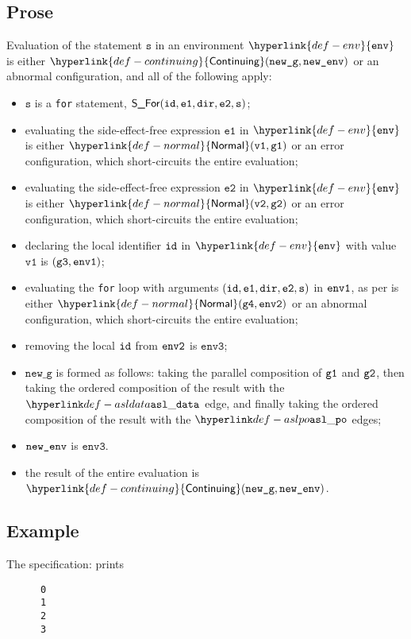 \documentclass{book}
\newcommand\ProseOrAbnormal[0]{or an abnormal configuration, which short-circuits the entire evaluation}
\newcommand\ProseOrError[0]{or an error configuration, which short-circuits the entire evaluation}
\newcommand\Normal[0]{\hyperlink{def-normal}{\textsf{Normal}}}
\newcommand\Continuing[0]{\hyperlink{def-continuing}{\textsf{Continuing}}}
\newcommand\env[0]{\hyperlink{def-env}{\texttt{env}}}
\newcommand\envthree[0]{\texttt{env3}}
\newcommand\newg[0]{\texttt{new\_g}}
\newcommand\vs[0]{\texttt{s}}
\newcommand\vvone[0]{\texttt{v1}}
\newcommand\vvtwo[0]{\texttt{v2}}
\newcommand\veone[0]{\texttt{e1}}
\newcommand\vetwo[0]{\texttt{e2}}
\newcommand\vgthree[0]{\texttt{g3}}
\newcommand\vgfour[0]{\texttt{g4}}
\newcommand\dir[0]{\texttt{dir}}
\begin{document}
    \subsection{Prose}
    Evaluation of the statement $\vs$ in an environment $\env$ is
    either $\Continuing(\newg, \newenv)$ or an abnormal configuration,
    and all of the following apply:
    \begin{itemize}
    \item $\vs$ is a \texttt{for} statement, $\SFor(\id, \veone, \dir, \vetwo, \vs)$;
    \item evaluating the side-effect-free expression $\veone$ in $\env$ is either
    $\Normal(\vvone, \vgone)$ \ProseOrError;
    \item evaluating the side-effect-free expression $\vetwo$ in $\env$ is either
    $\Normal(\vvtwo, \vgtwo)$ \ProseOrError;
    \item declaring the local identifier $\texttt{id}$ in $\env$ with value $\vvone$ is $(\vgthree, \envone)$;
    \item evaluating the \texttt{for} loop with arguments $(\id, \veone, \dir, \vetwo, \vs)$ in $\texttt{env1}$,
    as per  is either $\Normal(\vgfour, \envtwo)$ \ProseOrAbnormal;
    \item removing the local $\texttt{id}$ from $\texttt{env2}$ is $\envthree$;
    \item $\newg$ is formed as follows: taking the parallel composition of $\texttt{g1}$ and $\texttt{g2}$,
    then taking the ordered composition of the result with the $\asldata$ edge,
    and finally taking the ordered composition of the result with the $\aslpo$ edges;
    \item $\texttt{new\_env}$ is $\envthree$.
    \item the result of the entire evaluation is $\Continuing(\newg, \newenv)$.
    \end{itemize}

    \subsection{Example}
    The specification:
    prints
    \begin{Verbatim}
      0
      1
      2
      3
    \end{Verbatim}


\end{document}
